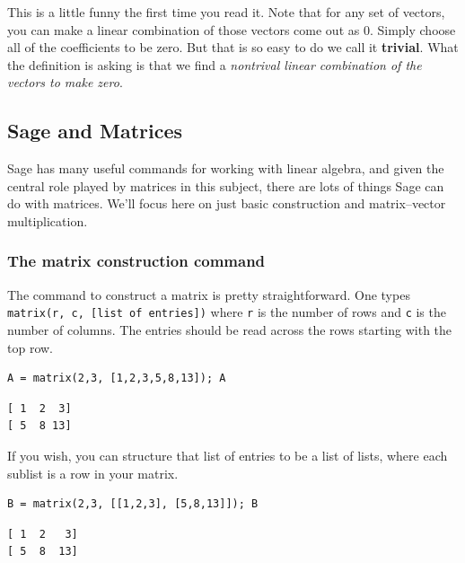 \documentclass[10pt,]{book}
\newcommand{\terminology}[1]{\textbf{#1}}
\theoremstyle{plain}
\theoremstyle{definition}
\numberwithin{equation}{section}
\begin{document}
        This is a little funny the first time you read it. Note that for any
        set of vectors, you can make a linear combination of those vectors
        come out as \(0\). Simply choose all of the coefficients to be
        zero. But that is so easy to do we call it \terminology{trivial}. What the
        definition is asking is that we find a \emph{nontrival linear
        combination of the vectors to make zero}.
\typeout{************************************************}
\typeout{************************************************}
\subsection[Sage and Matrices]{Sage and Matrices}\label{subsection-13}

      Sage has many useful commands for working with linear algebra, and
      given the central role played by matrices in this subject, there are
      lots of things Sage can do with matrices. We'll focus here on just basic
      construction and matrix--vector multiplication.
\typeout{************************************************}
\typeout{************************************************}
\subsubsection[The matrix construction command]{The matrix construction command}\label{subsubsection-7}
The command to construct a matrix is pretty straightforward. One types
        \verb?matrix(r, c, [list of entries])? where \verb?r? is
        the number of rows and \verb?c? is the number of columns. The entries
        should be read across the rows starting with the top row.
\begin{lstlisting}[style=sageinput]
A = matrix(2,3, [1,2,3,5,8,13]); A
\end{lstlisting}
\begin{lstlisting}[style=sageoutput]
[ 1  2  3]
[ 5  8 13]
\end{lstlisting}
\par
If you wish, you can structure that list of entries to be a list of lists,
        where each sublist is a row in your matrix.
\begin{lstlisting}[style=sageinput]
B = matrix(2,3, [[1,2,3], [5,8,13]]); B
\end{lstlisting}
\begin{lstlisting}[style=sageoutput]
[ 1  2   3]
[ 5  8  13]
\end{lstlisting}
\par
\end{document}
